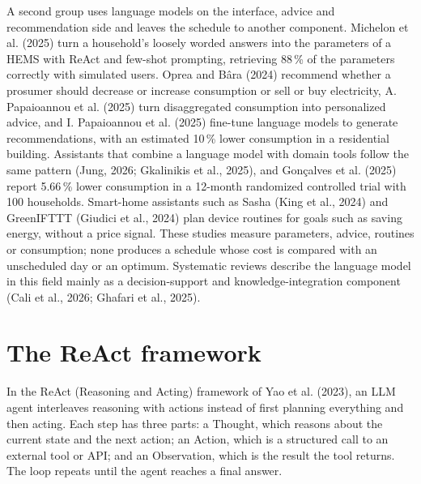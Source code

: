 \documentclass[12pt,a4paper]{report}
\begin{document}
A second group uses language models on the interface, advice and
recommendation side and leaves the schedule to another component.
Michelon et al. (2025) turn a household's loosely worded answers into
the parameters of a HEMS with ReAct and few-shot prompting, retrieving
88\,\% of the parameters correctly with simulated users. Oprea and Bâra
(2024) recommend whether a prosumer should decrease or increase
consumption or sell or buy electricity, A. Papaioannou et al. (2025)
turn disaggregated consumption into personalized advice, and I.
Papaioannou et al. (2025) fine-tune language models to generate
recommendations, with an estimated 10\,\% lower consumption in a
residential building. Assistants that combine a language model with
domain tools follow the same pattern (Jung, 2026; Gkalinikis et al.,
2025), and Gonçalves et al. (2025) report 5.66\,\% lower consumption in
a 12-month randomized controlled trial with 100 households. Smart-home
assistants such as Sasha (King et al., 2024) and GreenIFTTT (Giudici et
al., 2024) plan device routines for goals such as saving energy, without
a price signal. These studies measure parameters, advice, routines or
consumption; none produces a schedule whose cost is compared with an
unscheduled day or an optimum. Systematic reviews describe the language
model in this field mainly as a decision-support and
knowledge-integration component (Cali et al., 2026; Ghafari et al.,
2025).

\section{The ReAct framework}

In the ReAct (Reasoning and Acting) framework of Yao et al. (2023), an
LLM agent interleaves reasoning with actions instead of first planning
everything and then acting. Each step has three parts: a Thought, which
reasons about the current state and the next action; an Action, which is
a structured call to an external tool or API; and an Observation, which
is the result the tool returns. The loop repeats until the agent reaches
a final answer.
\end{document}
